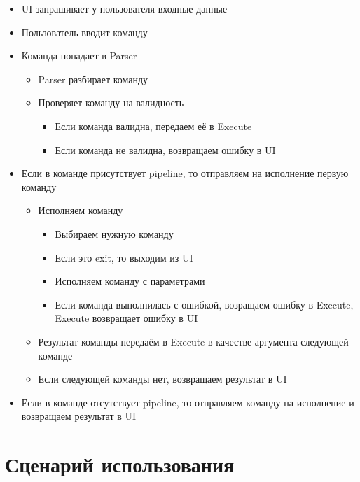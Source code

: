 \documentclass[a4paper,12pt]{article}
\begin{document}
\begin{itemize}
	\item UI запрашивает у пользователя входные данные
	\item Пользователь вводит команду
	\item Команда попадает в Parser

	      \begin{itemize}
		      \item Parser разбирает команду
		      \item Проверяет команду на валидность
		            \begin{itemize}
			            \item Если команда валидна, передаем её в Execute
			            \item Если команда не валидна, возвращаем ошибку в UI
		            \end{itemize}
	      \end{itemize}
	\item Если в команде присутствует pipeline, то отправляем на исполнение первую команду
	      \begin{itemize}
		      \item Исполняем команду
		            \begin{itemize}
			            \item Выбираем нужную команду
			            \item Если это exit, то выходим из UI
			            \item Исполняем команду с параметрами
			            \item Если команда выполнилась с ошибкой, возращаем ошибку в Execute, Execute возвращает ошибку в UI
		            \end{itemize}
		      \item Результат команды передаём в Execute в качестве аргумента следующей команде
		      \item Если следующей команды нет, возвращаем результат в UI
	      \end{itemize}
	\item Если в команде отсутствует pipeline, то отправляем команду на исполнение и возвращаем результат в UI
\end{itemize}


\newpage

\section*{Сценарий использования}
\end{document}
